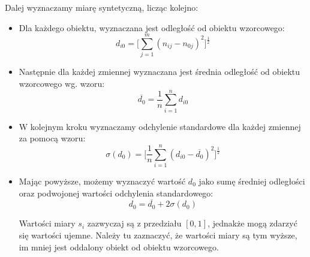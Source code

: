 \documentclass[12pt,a4paper]{report}
\begin{document}
Dalej wyznaczamy miarę syntetyczną, licząc kolejno:
\begin{itemize}
\item Dla każdego obiektu, wyznaczana jest odległość od obiektu wzorcowego:
$$d_{i0}=\bigg[\sum_{j=1}^{m} (n_{ij} - n_{0j})^2 \bigg]^\frac{1}{2}  $$ 
\item Następnie dla każdej zmiennej wyznaczana jest średnia odległość od obiektu wzorcowego wg. wzoru:
$$\overline{d_{0}}=\frac{1}{n}\sum_{i=1}^{n} d_{i0} $$
\item W kolejnym kroku wyznaczamy odchylenie standardowe dla każdej zmiennej za pomocą wzoru: 
$$\sigma(d_{0})=\bigg[\frac{1}{n}\sum_{i=1}^{n} (d_{i0}-\overline{d_{0}})^2 \bigg]^\frac{1}{2} $$
\item Mając powyższe, możemy wyznaczyć wartość $d_{0}$ jako sumę średniej odległości oraz podwojonej wartości odchylenia standardowego:
$$d_{0}=\overline{d_{0}} + 2\sigma(d_{0}) $$


Wartości miary $s_{i}$ zazwyczaj są z przedziału $[0, 1]$, jednakże mogą zdarzyć się wartości ujemne. Należy tu zaznaczyć, że wartości miary są tym wyższe, im mniej jest oddalony obiekt od obiektu wzorcowego. 

\end{itemize}
%
%
\end{document}
